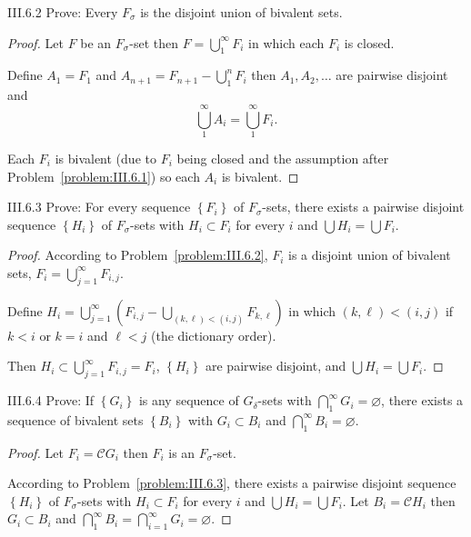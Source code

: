 \begin{problem}{III.6.2}\label{problem:III.6.2}
Prove: Every \(F_{\sigma}\) is the disjoint union of bivalent sets.
\end{problem}

\begin{proof}
	Let \(F\) be an \(F_{\sigma}\)-set then \( F = \bigcup^{\infty}_{1} F_{i} \) in which each \(F_{i}\) is closed.

	Define \(A_{1} = F_{1}\) and \(A_{n+1} = F_{n+1} - \bigcup^{n}_{1} F_{i}\) then \( A_{1}, A_{2}, \ldots \) are pairwise disjoint and
	\[
		\bigcup^{\infty}_{1} A_{i} = \bigcup^{\infty}_{1} F_{i}.
	\]

	Each \(F_{i}\) is bivalent (due to \(F_{i}\) being closed and the assumption after Problem~\ref{problem:III.6.1}) so each \(A_{i}\) is bivalent.
\end{proof}

\begin{problem}{III.6.3}\label{problem:III.6.3}
Prove: For every sequence \( \left\{ F_{i} \right\} \) of \(F_{\sigma}\)-sets, there exists a pairwise disjoint sequence \( \left\{ H_{i} \right\} \) of \(F_{\sigma}\)-sets with \(H_{i} \subset F_{i}\) for every \(i\) and \( \bigcup H_{i} = \bigcup F_{i} \).
\end{problem}

\begin{proof}
	According to Problem~\ref{problem:III.6.2}, \( F_{i} \) is a disjoint union of bivalent sets, \( F_{i} = \bigcup^{\infty}_{j=1} F_{i,j} \).

	Define \( H_{i} = \bigcup^{\infty}_{j=1} \left(F_{i,j} - \bigcup_{(k,\ell) < (i,j)} F_{k,\ell}\right) \) in which \( (k,\ell) < (i,j) \) if \( k < i \) or \( k = i \) and \( \ell < j \) (the dictionary order).

	Then \( H_{i} \subset \bigcup^{\infty}_{j=1} F_{i,j} = F_{i} \), \( \left\{ H_{i} \right\} \) are pairwise disjoint, and \( \bigcup H_{i} = \bigcup F_{i} \).
\end{proof}

\begin{problem}{III.6.4}\label{problem:III.6.4}
Prove: If \( \left\{ G_{i} \right\} \) is any sequence of \(G_{\delta}\)-sets with \( \bigcap^{\infty}_{1} G_{i} = \varnothing \), there exists a sequence of bivalent sets \( \left\{ B_{i} \right\} \) with \(G_{i} \subset B_{i}\) and \( \bigcap^{\infty}_{1} B_{i} = \varnothing \).
\end{problem}

\begin{proof}
	Let \( F_{i} = \mathscr{C}G_{i} \) then \( F_{i} \) is an \( F_{\sigma} \)-set.

	According to Problem~\ref{problem:III.6.3}, there exists a pairwise disjoint sequence \( \left\{ H_{i} \right\} \) of \(F_{\sigma}\)-sets with \(H_{i} \subset F_{i}\) for every \(i\) and \( \bigcup H_{i} = \bigcup F_{i} \). Let \( B_{i} = \mathscr{C}H_{i} \) then \( G_{i} \subset B_{i} \) and \( \bigcap^{\infty}_{1} B_{i} = \bigcap^{\infty}_{i=1} G_{i} = \varnothing \).
\end{proof}

